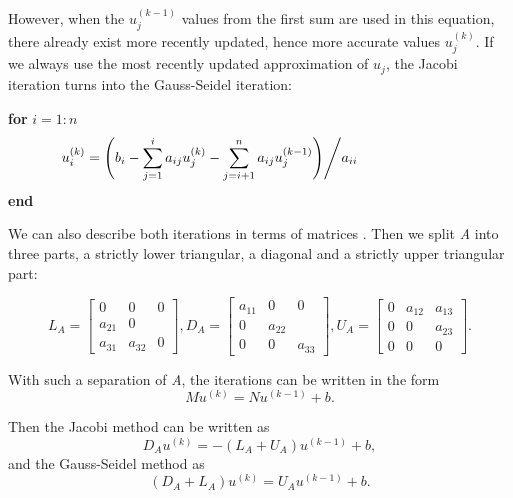 However, when the $u_j^{(k-1)}$ values from the first sum are used in this equation, there already exist more recently updated, hence more accurate values $u_j^{(k)}$. If we always use the most recently updated approximation of $u_j$, the Jacobi iteration turns into the Gauss-Seidel iteration:

\noindent\hspace*{15mm}\textbf{for } $i = 1:n$
\begin{align}
\hspace*{-25mm} u_i^{(k)} = \Bigg ( b_i - \sum_{j = 1}^{i} a_{ij}u_j^{(k)} - \sum_{j = i+1}^{n} a_{ij} u_j^{(k-1)} \Bigg ) \Bigg / a_{ii}
\end{align}
\hspace*{15mm}\textbf{end}

We can also describe both iterations in terms of matrices \cite{golub1996matrix}. Then we split \textit{A} into three parts, a strictly lower triangular, a diagonal and a strictly upper triangular part:

\begin{equation}
L_A = 
\begin{bmatrix}
0 & 0 & 0 \\
a_{21} & 0 & \\
a_{31} & a_{32} & 0
\end{bmatrix}, D_A = 
\begin{bmatrix}
a_{11} & 0 & 0 \\
0 & a_{22} & \\
0 & 0 & a_{33}
\end{bmatrix}, U_A = 
\begin{bmatrix}
0 & a_{12} & a_{13} \\
0 & 0 & a_{23}\\
0 & 0 & 0
\end{bmatrix}.
\end{equation}

With such a separation of \textit{A}, the iterations can be written in the form
\begin{equation}
M u^{(k)} = N u^{(k-1)} + b.
\end{equation}

Then the Jacobi method \cite{golub1996matrix} can be written as
\begin{equation}
D_A u^{(k)} = -(L_A + U_A) u^{(k-1)} + b,
\end{equation}
and the Gauss-Seidel method as
\begin{equation}
(D_A + L_A) u^{(k)} = U_A u^{(k-1)} + b.
\end{equation}

